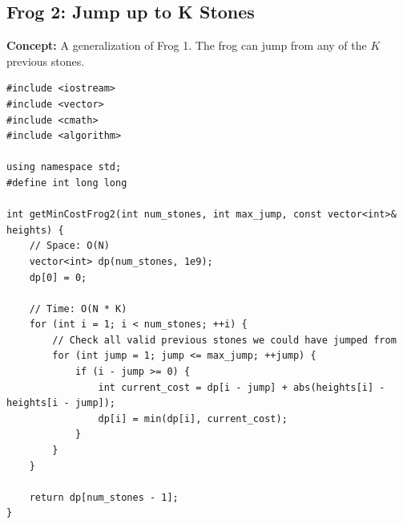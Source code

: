 \subsection{Frog 2: Jump up to K Stones}
\textbf{Concept:} A generalization of Frog 1. The frog can jump from any of the $K$ previous stones.

\begin{lstlisting}
#include <iostream>
#include <vector>
#include <cmath>
#include <algorithm>

using namespace std;
#define int long long

int getMinCostFrog2(int num_stones, int max_jump, const vector<int>& heights) {
    // Space: O(N)
    vector<int> dp(num_stones, 1e9); 
    dp[0] = 0;
    
    // Time: O(N * K)
    for (int i = 1; i < num_stones; ++i) {
        // Check all valid previous stones we could have jumped from
        for (int jump = 1; jump <= max_jump; ++jump) {
            if (i - jump >= 0) {
                int current_cost = dp[i - jump] + abs(heights[i] - heights[i - jump]);
                dp[i] = min(dp[i], current_cost);
            }
        }
    }
    
    return dp[num_stones - 1];
}
\end{lstlisting}